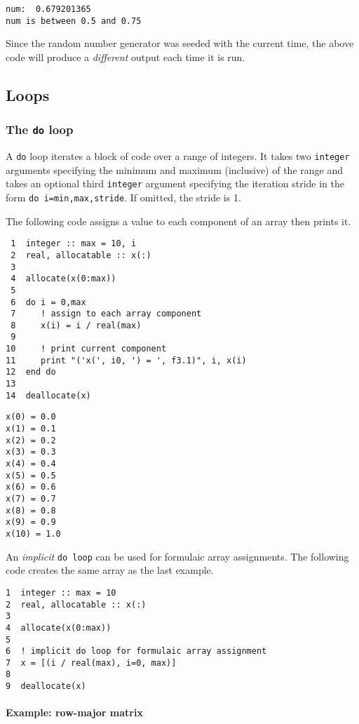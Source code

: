 \documentclass[11pt]{article}
\begin{document}
\begin{verbatim}
num:  0.679201365    
num is between 0.5 and 0.75
\end{verbatim}

Since the random number generator was seeded with the current time, the above code will produce a \emph{different} output each time it is run.

\subsection{Loops}
\label{sec:orgheadline34}
\subsubsection{The \texttt{do} loop}
\label{sec:orgheadline29}
A \texttt{do} loop iterates a block of code over a range of integers. It takes two \texttt{integer} arguments specifying the minimum and maximum (inclusive) of the range and takes an optional third \texttt{integer} argument specifying the iteration stride in the form \texttt{do i=min,max,stride}. If omitted, the stride is 1.

The following code assigns a value to each component of an array then prints it.

\begin{verbatim}
 1  integer :: max = 10, i
 2  real, allocatable :: x(:)
 3  
 4  allocate(x(0:max))
 5  
 6  do i = 0,max
 7     ! assign to each array component
 8     x(i) = i / real(max)
 9  
10     ! print current component
11     print "('x(', i0, ') = ', f3.1)", i, x(i)
12  end do
13  
14  deallocate(x)
\end{verbatim}

\begin{verbatim}
x(0) = 0.0
x(1) = 0.1
x(2) = 0.2
x(3) = 0.3
x(4) = 0.4
x(5) = 0.5
x(6) = 0.6
x(7) = 0.7
x(8) = 0.8
x(9) = 0.9
x(10) = 1.0
\end{verbatim}

An \emph{implicit} \texttt{do loop} can be used for formulaic array assignments. The following code creates the same array as the last example.

\begin{verbatim}
1  integer :: max = 10
2  real, allocatable :: x(:)
3  
4  allocate(x(0:max))
5  
6  ! implicit do loop for formulaic array assignment
7  x = [(i / real(max), i=0, max)]
8  
9  deallocate(x)
\end{verbatim}

\paragraph{Example: row-major matrix}
\label{sec:orgheadline28}
\end{document}
